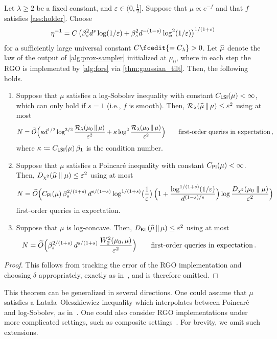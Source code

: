 \begin{theorem}
    Let $\lambda\geq 2$ be a fixed constant, and $\varepsilon\in(0,\frac12]$.
    Suppose that $\mu\propto e^{-f}$ and that $f$ satisfies \cref{ass:holder}.
    Choose
    \begin{align*}
        \eta^{-1} = C\,\prn[\big]{\beta_s^2 d^s\log(1/\varepsilon) + \beta_s^2 d^{-(1-s)} \log^2(1/\varepsilon)}^{1/(1+s)}
    \end{align*}
    for a sufficiently large universal constant $C\fcedit{=C_\lambda} > 0$.
    Let $\wh\mu$ denote the law of the output of \cref{alg:prox-sampler} initialized at $\mu_0$, where in each step the RGO is implemented by \cref{alg:fors} via \cref{thm:gaussian_tilt}.
    Then, the following holds. 
    \begin{enumerate}
        \item Suppose that $\mu$ satisfies a log-Sobolev inequality with constant $\CLSI(\mu) < \infty$, which can only hold if $s = 1$ (i.e., $f$ is smooth).
        Then, $\Ren{\wh\mu}{\mu} \le \varepsilon^2$ using at most
        \begin{align*}
            N = \wt O\prn[\Big]{\kappa d^{1/2} \log^{3/2} \frac{\Ren{\mu_0}{\mu}}{\varepsilon^2} + \kappa \log^2 \frac{\Ren{\mu_0}{\mu}}{\varepsilon^2}} \qquad\text{first-order queries in expectation}\,,
        \end{align*}
        where $\kappa \deq \CLSI(\mu)\, \beta_1$ is the condition number. %
        \item Suppose that $\mu$ satisfies a Poincar\'e inequality with constant $\CPI(\mu) < \infty$.
        Then, $\Dchis{\wh\mu}{\mu} \le \varepsilon^2$ using at most
        \begin{align*}
            N = \wt O\prn[\Big]{\CPI(\mu)\,\beta_s^{2/(1+s)}\,d^{s/(1+s)} \log^{1/(1+s)}\prn[\big]{\frac{1}{\varepsilon}} \,\prn[\Big]{1 + \frac{\log^{1/(1+s)}(1/\varepsilon)}{d^{(1-s)/s}}}\log \frac{\Dchis{\mu_0}{\mu}}{\varepsilon^2}}
        \end{align*}
        first-order queries in expectation.
        \item Suppose that $\mu$ is log-concave.
        Then, $\Dkl{\wh\mu}{\mu} \le \varepsilon^2$ using at most
        \begin{align*}
            N = \wt O\prn[\Big]{\beta_s^{2/(1+s)}\,d^{s/(1+s)} \,\frac{W_2^2(\mu_0,\mu)}{\varepsilon^2}}\qquad\text{first-order queries in expectation}\,.
        \end{align*}
    \end{enumerate}
\end{theorem}
\begin{proof}
    This follows from tracking the error of the RGO implementation and choosing $\delta$ appropriately, exactly as in~\citet{AltChe24Warm}, and is therefore omitted.
\end{proof}

This theorem can be generalized in several directions.
One could assume that $\mu$ satisfies a Lata\l{}a--Oleszkiewicz inequality which interpolates between Poincar\'e and log-Sobolev, as in~\citet{Chen+22ProxSampler, Che+24LMC}.
One could also consider RGO implementations under more complicated settings, such as composite settings~\citep{FanYuaChe23ImprovedProx}.
For brevity, we omit such extensions.
